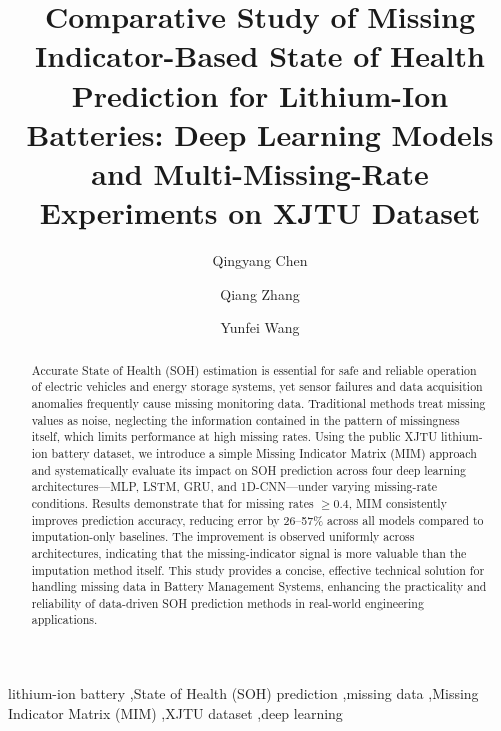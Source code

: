 \documentclass[5p,times]{elsarticle}
\begin{document}
\begin{frontmatter}

\title{Comparative Study of Missing Indicator-Based State of Health Prediction for Lithium-Ion Batteries: Deep Learning Models and Multi-Missing-Rate Experiments on XJTU Dataset}

\author[inst1]{Qingyang Chen}
\author[inst1]{Qiang Zhang}
\author[inst2]{Yunfei Wang}

\address[inst1]{School of Nuclear Science and Energy Engineering, Shandong University, Jinan 250061, China}
\address[inst2]{Shandong Supermaly Generating Equipment Co., Ltd, No.5153 Yingqian Street, Hi-technology Development Zone, Weifang 261061, Shandong, China}

\begin{abstract}
Accurate State of Health (SOH) estimation is essential for safe and reliable operation of electric vehicles and energy storage systems, yet sensor failures and data acquisition anomalies frequently cause missing monitoring data. Traditional methods treat missing values as noise, neglecting the information contained in the pattern of missingness itself, which limits performance at high missing rates. Using the public XJTU lithium-ion battery dataset, we introduce a simple Missing Indicator Matrix (MIM) approach and systematically evaluate its impact on SOH prediction across four deep learning architectures---MLP, LSTM, GRU, and 1D-CNN---under varying missing-rate conditions. Results demonstrate that for missing rates $\geq$0.4, MIM consistently improves prediction accuracy, reducing error by 26--57\% across all models compared to imputation-only baselines. The improvement is observed uniformly across architectures, indicating that the missing-indicator signal is more valuable than the imputation method itself. This study provides a concise, effective technical solution for handling missing data in Battery Management Systems, enhancing the practicality and reliability of data-driven SOH prediction methods in real-world engineering applications.
\end{abstract}

\begin{keyword}
lithium-ion battery \sep State of Health (SOH) prediction \sep missing data \sep Missing Indicator Matrix (MIM) \sep XJTU dataset \sep deep learning
\end{keyword}

\end{frontmatter}
\end{document}
